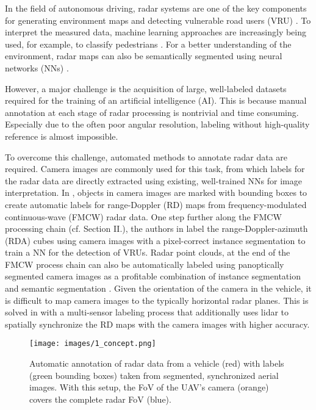 \documentclass[conference]{IEEEtran}
\begin{document}
In the field of autonomous driving, radar systems are one of the key components for generating environment maps and detecting vulnerable road users (VRU) \cite{b1}.
To interpret the measured data, machine learning approaches are increasingly being used, for example, to classify pedestrians \cite{b2}.
For a better understanding of the environment, radar maps can also be semantically segmented using neural networks (NNs) \cite{b3}.

However, a major challenge is the acquisition of large, well-labeled datasets required for the training of an artificial intelligence (AI).
This is because manual annotation at each stage of radar processing is nontrivial and time consuming.
Especially due to the often poor angular resolution, labeling without high-quality reference is almost impossible.

To overcome this challenge, automated methods to annotate radar data are required.
Camera images are commonly used for this task, from which labels for the radar data are directly extracted using existing, well-trained NNs for image interpretation.
In \cite{b4}, objects in camera images are marked with bounding boxes to create automatic labels for range-Doppler (RD) maps from frequency-modulated continuous-wave (FMCW) radar data.
One step further along the FMCW processing chain (cf. Section II.), the authors in \cite{b5} label the range-Doppler-azimuth (RDA) cubes using camera images with a pixel-correct instance segmentation to train a NN for the detection of VRUs.
Radar point clouds, at the end of the FMCW process chain can also be automatically labeled using panoptically segmented camera images as a profitable combination of instance segmentation and semantic segmentation \cite{b6}.
Given the orientation of the camera in the vehicle, it is difficult to map camera images to the typically horizontal radar planes.
This is solved in \cite{b7} with a multi-sensor labeling process that additionally uses lidar to spatially synchronize the RD maps with the camera images with higher accuracy.

\begin{figure}[t]
    \centering
    \vspace{-0.2cm}
    \texttt{[image: images/1\_concept.png]}
    \vspace{-0.3cm}
    \caption{Automatic annotation of radar data from a vehicle (red) with labels (green bounding boxes) taken from segmented, synchronized aerial images. With this setup, the FoV of the UAV's camera (orange) covers the complete radar FoV (blue).}
    \label{fig:concept}
\end{figure}
\end{document}
